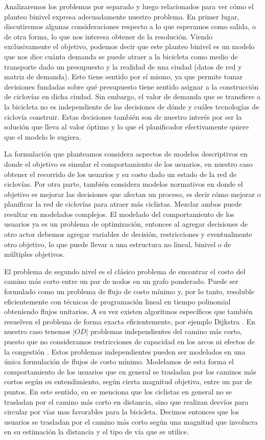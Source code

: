Analizaremos los problemas por separado y luego relacionados para ver cómo el planteo binivel expresa adecuadamente nuestro problema. En primer lugar, discutiremos algunas consideraciones respecto a lo que esperamos como salida, o de otra forma, lo que nos interesa obtener de la resolución. Viendo exclusivamente el objetivo, podemos decir que este planteo binivel es un modelo que nos dice cuánta demanda se puede atraer a la bicicleta como medio de transporte dado un presupuesto y la realidad de una ciudad (datos de red y matriz de demanda). Esto tiene sentido por sí mismo, ya que permite tomar decisiones fundadas sobre qué presupuesto tiene sentido asignar a la construcción de ciclovías en dicha ciudad. Sin embargo, el valor de demanda que se transfiere a la bicicleta no es independiente de las decisiones de dónde y cuáles tecnologías de ciclovía construir. Estas decisiones también son de nuestro interés por ser la solución que lleva al valor óptimo y lo que el planificador efectivamente quiere que el modelo le sugiera.

La formulación que planteamos considera aspectos de modelos descriptivos en donde el objetivo es simular el comportamiento de los usuarios, en nuestro caso obtener el recorrido de los usuarios y su costo dado un estado de la red de ciclovías. Por otra parte, también considera modelos normativos en donde el objetivo es mejorar las decisiones que afectan un proceso, es decir cómo mejorar o planificar la red de ciclovías para atraer más ciclistas. Mezclar ambos puede resultar en modelados complejos. El modelado del comportamiento de los usuarios ya es un problema de optimización, entonces al agregar decisiones de otro actor debemos agregar variables de decisión, restricciones y eventualmente otro objetivo, lo que puede llevar a una estructura no lineal, binivel o de múltiples objetivos.

El problema de segundo nivel es el clásico problema de encontrar el costo del camino más corto entre un par de nodos en un grafo ponderado. Puede ser formulado como un problema de flujo de costo mínimo y, por lo tanto, resoluble eficientemente con técnicas de programación lineal en tiempo polinomial obteniendo flujos unitarios. A su vez existen algoritmos específicos que también resuelven el problema de forma exacta eficientemente, por ejemplo Dijkstra \parencite{networkflowsbook}. En nuestro caso tenemos $|OD|$ problemas independientes del camino más corto, puesto que no consideramos restricciones de capacidad en los arcos ni efectos de la congestión \parencite{Sheffi1985}. Estos problemas independientes pueden ser modelados en una única formulación de flujos de costo mínimo. Modelamos de esta forma el comportamiento de los usuarios que en general se trasladan por los caminos más cortos según su entendimiento, según cierta magnitud objetiva, entre un par de puntos. En este sentido, en \parencite{winters2010} se menciona que los ciclistas en general no se trasladan por el camino más corto en distancia, sino que realizan desvíos para circular por vías mas favorables para la bicicleta. Decimos entonces que los usuarios se trasladan por el camino más corto según una magnitud que involucra en su estimación la distancia y el tipo de vía que se utilice.

